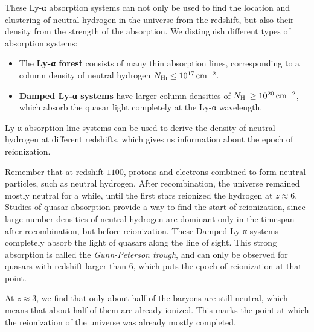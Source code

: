 These Ly-α absorption systems can not only be used to find the location and clustering of neutral hydrogen in the universe from the redshift, but also their density from the strength of the absorption.
We distinguish different types of absorption systems:
\begin{itemize}
	\item The \textbf{Ly-α forest} consists of many thin absorption lines,
	corresponding to a column density of neutral hydrogen $N_{\mathrm{H}\textsc{i}} \leq \SI{e17}{\centi\meter\tothe{-2}}$.
	\item \textbf{Damped Ly-α systems} have larger column densities of $N_{\mathrm{H}\textsc{i}} \geq \SI{e20}{\centi\meter\tothe{-2}}$,
	which absorb the quasar light completely at the Ly-α wavelength.
\end{itemize}

Ly-α absorption line systems can be used to derive the density of neutral hydrogen at different redshifts, which gives us information about the epoch of reionization.

Remember that at redshift $1100$, protons and electrons combined to form neutral particles, such as neutral hydrogen.
After recombination, the universe remained mostly neutral for a while, until the first stars reionized the hydrogen at $z \approx 6$.
Studies of quasar absorption provide a way to find the start of reionization, since large number densities of neutral hydrogen are dominant only in the timespan after recombination, but before reionization.
These Damped Ly-α systems completely absorb the light of quasars along the line of sight.
This strong absorption is called the \emph{Gunn-Peterson trough}, and can only be observed for quasars with redshift larger than $6$, which puts the epoch of reionization at that point.

At $z \approx 3$, we find that only about half of the baryons are still neutral, which means that about half of them are already ionized.
This marks the point at which the reionization of the universe was already mostly completed.



